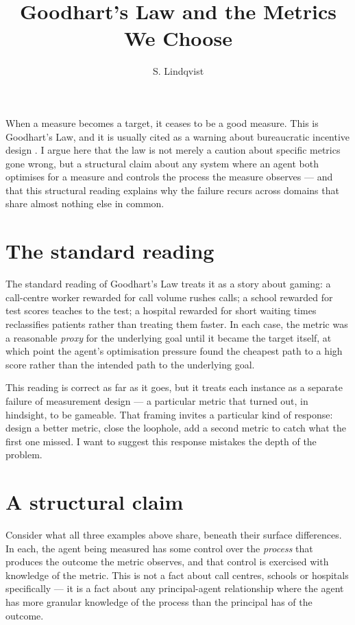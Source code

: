\documentclass{term-paper}
\title{Goodhart's Law and the Metrics We Choose}
\author{S. Lindqvist}
\begin{document}
When a measure becomes a target, it ceases to be a good measure. This
is Goodhart's Law, and it is usually cited as a warning about
bureaucratic incentive design \parencite{strathern1997}. I argue here
that the law is not merely a caution about specific metrics gone
wrong, but a structural claim about any system where an agent both
optimises for a measure and controls the process the measure
observes --- and that this structural reading explains why the
failure recurs across domains that share almost nothing else in
common.

\section{The standard reading}

The standard reading of Goodhart's Law treats it as a story about
gaming: a call-centre worker rewarded for call volume rushes calls;
a school rewarded for test scores teaches to the test; a hospital
rewarded for short waiting times reclassifies patients rather than
treating them faster. In each case, the metric was a reasonable
\emph{proxy} for the underlying goal until it became the target
itself, at which point the agent's optimisation pressure found the
cheapest path to a high score rather than the intended path to the
underlying goal.

This reading is correct as far as it goes, but it treats each
instance as a separate failure of measurement design --- a
particular metric that turned out, in hindsight, to be gameable. That
framing invites a particular kind of response: design a better
metric, close the loophole, add a second metric to catch what the
first one missed. I want to suggest this response mistakes the
depth of the problem.

\section{A structural claim}

Consider what all three examples above share, beneath their surface
differences. In each, the agent being measured has some control over
the \emph{process} that produces the outcome the metric observes,
and that control is exercised with knowledge of the metric. This is
not a fact about call centres, schools or hospitals specifically ---
it is a fact about any principal-agent relationship where the agent
has more granular knowledge of the process than the principal has of
the outcome.
\end{document}
